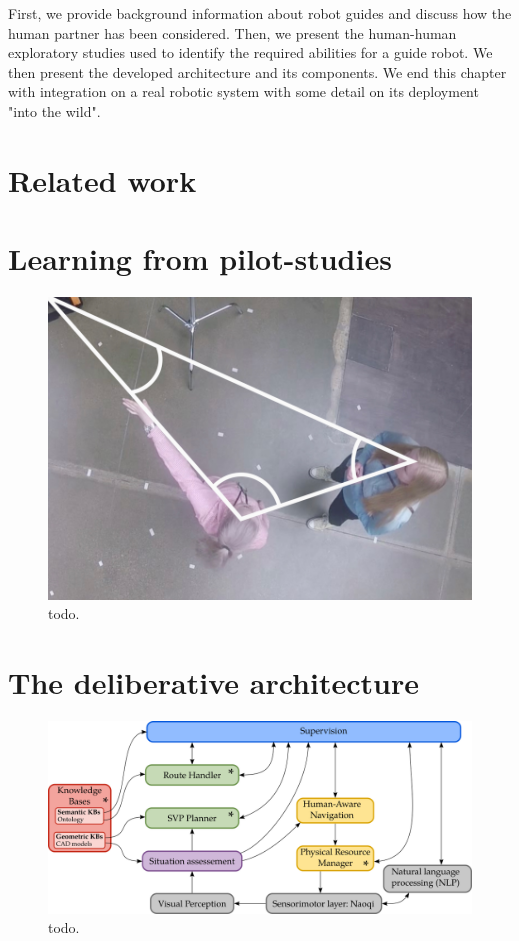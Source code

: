 First, we provide background information about robot guides and discuss how the human partner has been considered. Then, we present the human-human exploratory studies used to identify the required abilities for a guide robot. We then present the developed architecture and its components. We end this chapter with integration on a real robotic system with some detail on its deployment "into the wild".

\section{Related work}

\section{Learning from pilot-studies}

\begin{figure}[ht!]
\centering
\includegraphics[scale=0.35]{figures/chapter8/human_guide.png}
\caption{\label{fig:chap8_human_guide} todo. }
\end{figure}

\section{The deliberative architecture}

\begin{figure}[ht!]
\centering
\includegraphics[width=\textwidth]{figures/chapter8/architecture.png}
\caption{\label{fig:chap8_architecture} todo. }
\end{figure}

